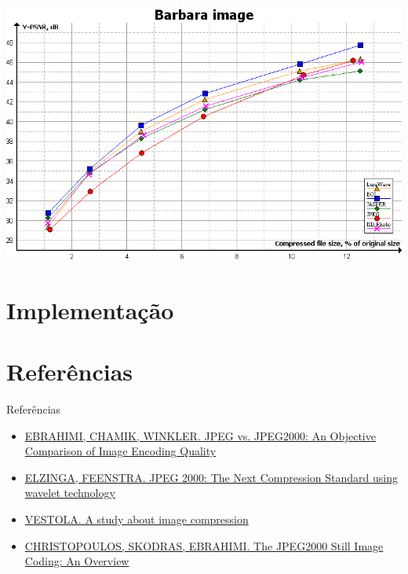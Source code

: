 \documentclass{beamer}
\begin{document}
\begin{frame}
   \includegraphics[width=\textwidth]{figure/barbara_psnr.png}
\end{frame}

\section{Implementação}
\section{Referências}
\begin{frame}{Referências}
   \begin{itemize}
      \item \href{http://stefan.winklerbros.net/Publications/adip2004.pdf}{EBRAHIMI, CHAMIK, WINKLER. JPEG vs. JPEG2000: An Objective Comparison of Image Encoding Quality}
      \item \href{http://faculty.gvsu.edu/aboufade/web/wavelets/student_work/EF/}{ELZINGA, FEENSTRA. JPEG 2000: The Next Compression Standard using wavelet technology}
      \item \href{http://www.mvnet.fi/index.php?osio=Tutkielmat&luokka=Yliopisto&sivu=Image_compression}{VESTOLA. A study about image compression}
      \item \href{http://web.stanford.edu/class/ee398a/handouts/papers/Christopoulos\%20-\%20JPEG2000.pdf}{CHRISTOPOULOS, SKODRAS, EBRAHIMI. The JPEG2000 Still Image Coding: An Overview}
   \end{itemize}
\end{frame}
\end{document}
